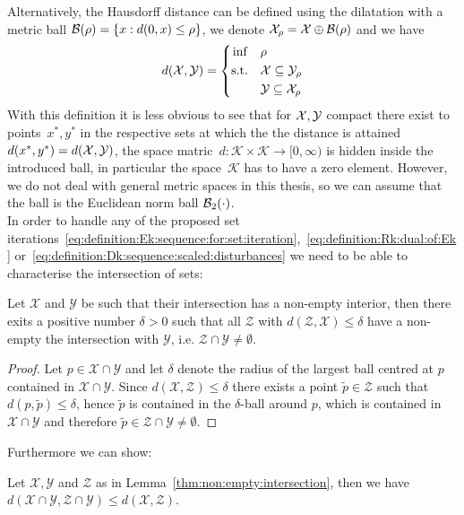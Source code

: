 %
Alternatively, the Hausdorff distance can be defined using the dilatation with a metric ball $\mathcal B(\rho)=\{x:d(0,x)\leq\rho\}$, we denote $\mathcal X_\rho = \mathcal X\oplus\mathcal B(\rho)$ and we have
%
\begin{equation}\label{eq:Hausdorff:bound:using:balls}
	d(\mathcal X,\mathcal Y) = \left\{\begin{aligned}\inf&\quad\rho\\\text{s.t.}&\quad \mathcal X\subseteq\mathcal Y_\rho\\&\quad\mathcal Y\subseteq\mathcal X_\rho\end{aligned}\right.
\end{equation}
%
With this definition it is less obvious to see that for $\mathcal X,\mathcal Y$ compact there exist to points~$x^\ast,y^\ast$ in the respective sets at which the the distance is attained~$d(x^\ast,y^\ast)=d(\mathcal X,\mathcal Y)$, the space matric~$d:\mathcal K\times\mathcal K\rightarrow [0,\infty)$ is hidden inside the introduced ball, in particular the space~$\mathcal K$ has to have a zero element.
%
However, we do not deal with general metric spaces in this thesis, so we can assume that the ball is the Euclidean norm ball $\mathcal B_2(\cdot)$.
%
\\[1em]
%
In order to handle any of the proposed set iterations~\eqref{eq:definition:Ek:sequence:for:set:iteration},~\eqref{eq:definition:Rk:dual:of:Ek} or~\eqref{eq:definition:Dk:sequence:scaled:disturbances} we need to be able to characterise the intersection of sets:
%
\begin{thm}\label{thm:non:empty:intersection}
Let $\mathcal X$ and $\mathcal Y$ be such that their intersection has a non-empty interior, then there exits a positive number $\delta>0$ such that all $\mathcal Z$ with $d(\mathcal Z,\mathcal X)\leq\delta$ have a non-empty the intersection with $\mathcal Y$, i.e. $\mathcal Z\cap\mathcal Y\neq\emptyset$.
\end{thm}
%
\begin{proof}
Let $p\in\mathcal X\cap\mathcal Y$ and let $\delta$ denote the radius of the largest ball centred at $p$ contained in $\mathcal X\cap\mathcal Y$.
%
Since $d(\mathcal X,\mathcal Z)\leq\delta$ there exists a point $\tilde p\in\mathcal Z$ such that $d(p,\tilde p)\leq \delta$, hence $\tilde p$ is contained in the $\delta$-ball around $p$, which is contained in $\mathcal X\cap\mathcal Y$ and therefore $\tilde p\in\mathcal Z\cap\mathcal Y\neq\emptyset$.
\end{proof}
%
\noindent Furthermore we can show:
%
\begin{thm}
Let $\mathcal X,\mathcal Y$ and $\mathcal Z$ as in Lemma~\ref{thm:non:empty:intersection}, then we have $d(\mathcal X\cap\mathcal Y,\mathcal Z\cap\mathcal Y)\leq d(\mathcal X,\mathcal Z)$.
\end{thm}
